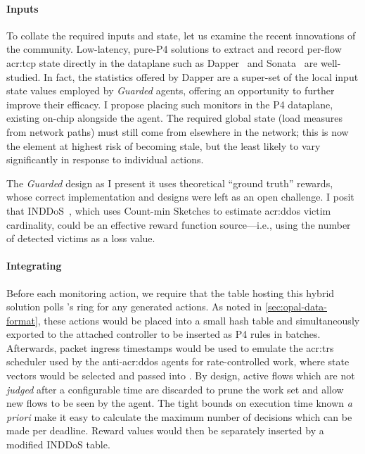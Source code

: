 
\paragraph{Inputs}
To collate the required inputs and state, let us examine the recent innovations of the community.
Low-latency, pure-P4 solutions to extract and record per-flow \gls{acr:tcp} state directly in the dataplane such as Dapper~\parencite{DBLP:conf/sosr/GhasemiBR17} and Sonata~\parencite{DBLP:conf/sigcomm/GuptaHCFRW18} are well-studied.
In fact, the statistics offered by Dapper are a super-set of the local input state values employed by \emph{Guarded} agents, offering an opportunity to further improve their efficacy. 
I propose placing such monitors in the P4 dataplane, existing on-chip alongside the \approachshort{} agent.
The required global state (load measures from network paths) must still come from elsewhere in the network; this is now the element at highest risk of becoming stale, but the least likely to vary significantly in response to individual actions.

The \emph{Guarded} design as I present it uses theoretical ``ground truth'' rewards, whose correct implementation and designs were left as an open challenge. 
I posit that INDDoS~\parencite{DBLP:journals/tnsm/DingSPCS21}, which uses Count-min Sketches to estimate \gls{acr:ddos} victim cardinality, could be an effective reward function source---i.e., using the number of detected victims as a loss value.

\paragraph{Integrating \approachshort}
Before each monitoring action, we require that the table hosting this hybrid solution polls \approachshort{}'s \outring{} ring for any generated actions.
As noted in \cref{sec:opal-data-format}, these actions would be placed into a small hash table and simultaneously exported to the attached controller to be inserted as P4 rules in batches.
Afterwards, packet ingress timestamps would be used to emulate the \gls{acr:trs} scheduler used by the anti-\gls{acr:ddos} agents for rate-controlled work, where state vectors would be selected and passed into \approachshort.
By design, active flows which are not \emph{judged} after a configurable time are discarded to prune the work set and allow new flows to be seen by the agent.
The tight bounds on execution time known \emph{a priori} make it easy to calculate the maximum number of decisions which can be made per deadline.
Reward values would then be separately inserted by a modified INDDoS table.

